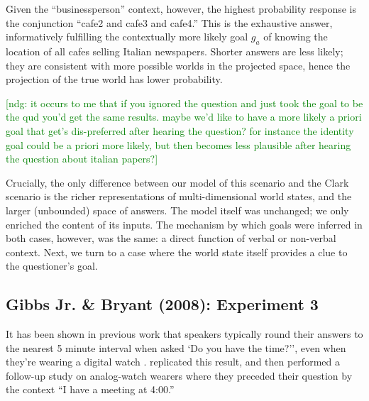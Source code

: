 \documentclass[12pt, floatsintext, jou]{apa6}
\newcommand{\ndg}[1]{\textcolor{Green}{[ndg: #1]}}
\begin{document}
Given the ``businessperson'' context, however, the highest probability response is the conjunction ``cafe2 and cafe3 and cafe4.'' This is the exhaustive answer, informatively fulfilling the contextually more likely goal $g_a$ of knowing the location of all cafes selling Italian newspapers. Shorter answers are less likely; they are consistent with more possible worlds in the projected space, hence the projection of the true world has lower probability. 

\ndg{it occurs to me that if you ignored the question and just took the goal to be the qud you'd get the same results. maybe we'd like to have a more likely a priori goal that get's dis-preferred after hearing the question? for instance the identity goal could be a priori more likely, but then becomes less plausible after hearing the question about italian papers?}

Crucially, the only difference between our model of this scenario and the Clark scenario is the richer representations of multi-dimensional world states, and the larger (unbounded) space of answers. The model itself was unchanged; we only enriched the content of its inputs. The mechanism by which goals were inferred in both cases, however, was the same: a direct function of verbal or non-verbal context. Next, we turn to a case where the world state itself provides a clue to the questioner's goal.


\subsection{Gibbs Jr. \& Bryant (2008): Experiment 3}

It has been shown in previous work that speakers typically round their answers to the nearest 5 minute interval when asked `Do you have the time?'', even when they're wearing a digital watch \cite{DerHenstCarlesSperber02_RelevanceTellingTime}.   replicated this result, and then performed a follow-up study on analog-watch wearers where they preceded their question by the context ``I have a meeting at 4:00.'' 
\end{document}
